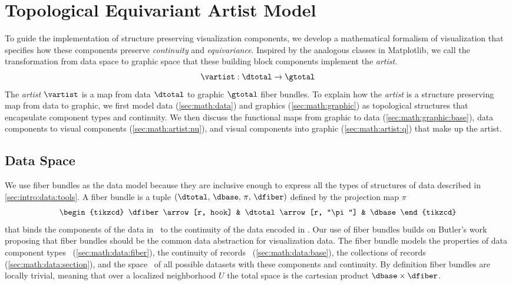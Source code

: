 \documentclass[../main.tex]{subfiles}
\begin{document}
\section{Topological Equivariant Artist Model}
\label{sec:math}
To guide the implementation of structure preserving visualization components, we develop a mathematical formalism of visualization that specifies how these components preserve \textit{continuity} and \textit{equivariance}. Inspired by the analogous classes in Matplotlib\cite{hunterArchitectureOpenSource}, we call the transformation from data space to graphic space that these building block components implement the \textit{artist}.
\begin{equation}
    \label{eq:artist}
    \mathscr{\vartist}: \mathscr{\dtotal} \rightarrow \mathscr{\gtotal}
\end{equation}
The \textit{artist} \(\mathscr{\vartist}\) is a map from data \(\mathscr{\dtotal}\) to graphic \(\mathscr{\gtotal}\) fiber bundles. To explain how the \textit{artist} is a structure preserving map from data to graphic, we first model data (\autoref{sec:math:data}) and graphics (\autoref{sec:math:graphic}) as topological structures that encapsulate component types and continuity. We then discuss the functional maps from graphic to data (\autoref{sec:math:graphic:base}), data components to visual components (\autoref{sec:math:artist:nu}), and visual components into graphic (\autoref{sec:math:artist:q}) that make up the artist.

\subsection{Data Space \dtotal}
\label{sec:math:data}
We use fiber bundles as the data model because they are inclusive enough to express all the types of structures of data described in \autoref{sec:intro:data:tools}. A fiber bundle is a tuple \((\dtotal,\,\dbase,\,\pi ,\,\dfiber)\) defined by the projection map \(\pi\)
\begin{equation}
    \label{eq:fiber_bundle}
    \begin{tikzcd}
        \dfiber \arrow[r, hook] & \dtotal \arrow[r, "\pi"] & \dbase
    \end{tikzcd}
\end{equation}
that binds the components of the data in \dfiber\ to the continuity of the data encoded in \dbase. Our use of fiber bundles builds on Butler's work proposing that fiber bundles should be the common data abstraction for visualization data\cite{butlerVectorBundleClassesForm1992, butlerVisualizationModelBased1989}. The fiber bundle models the properties of data component types \dfiber\ (\autoref{sec:math:data:fiber}), the continuity of records \dbase\ (\autoref{sec:math:data:base}), the collections of records (\autoref{sec:math:data:section}), and the space \dtotal\ of all possible datasets with these components and continuity. By definition fiber bundles are locally trivial\cite{spanier1989algebraic,LocallyTrivialFibre}, meaning that over a localized neighborhood \(U\) the total space is the cartesian product \(\dbase\times\dfiber\). 
\end{document}
